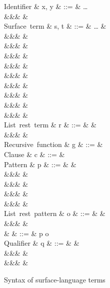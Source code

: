 \begin{figure}[H]
\begin{syntaxfig}
\mbox{Identifier}
&
x, y
&
::=
&
\ldots
\\
&&&
\primOp
&
\\
\mbox{Surface term}
&
s, t
&
::=
&
\ldots
&
\\
&&&
\exOp{\primOp}
&
\\
&&&
&
\\
&&&
&
\\
&&&
&
\\
&&&
&
\\
&&&
&
\\
&&&
&
\\
&&&
&
\\
&&&
&
\\[2mm]

\mbox{List rest term}
&
r
&
::=
&
\annListEnd{\alpha}
&
\\
&&&
&
\\[2mm]

\mbox{Recursive function}
&
g
&
::=
&
\\[2mm]

\mbox{Clause}
&
c
&
::=
&
\\[2mm]

\mbox{Pattern}
&
p
&
::=
&
&
\\
&&&
\pattNil
&
\\
&&&
&
\\
&&&
&
\\
&&&
&
\\[2mm]

\mbox{List rest pattern}
&
o
&
::=
&
\pattListEnd
&
\\
&&&
&
\\[2mm]

&
\pi
&
::=
&
p \mid o
\\[2mm]

\mbox{Qualifier}
&
q
&
::=
&
&
\\
&&&
&
\\
&&&
&
\\[2mm]

\end{syntaxfig}
\caption{Syntax of surface-language terms}
\end{figure}

